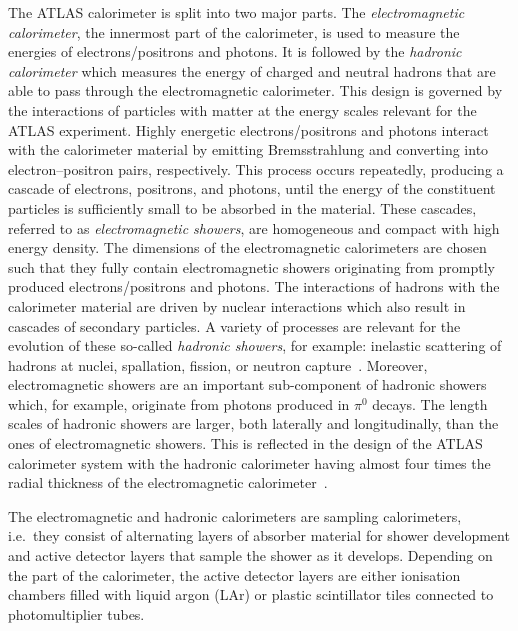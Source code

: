 The ATLAS calorimeter is split into two major parts. The \emph{electromagnetic
  calorimeter}, the innermost part of the calorimeter, is used to measure the
energies of electrons/positrons and photons. It is followed by the
\emph{hadronic calorimeter} which measures the energy of charged and neutral
hadrons that are able to pass through the electromagnetic calorimeter. This
design is governed by the interactions of particles with matter at the energy
scales relevant for the ATLAS experiment. Highly energetic electrons/positrons
and photons interact with the calorimeter material by emitting Bremsstrahlung
and converting into electron--positron pairs, respectively. This process occurs
repeatedly, producing a cascade of electrons, positrons, and photons, until the
energy of the constituent particles is sufficiently small to be absorbed in the
material. These cascades, referred to as \emph{electromagnetic showers}, are
homogeneous and compact with high energy density. The dimensions of the
electromagnetic calorimeters are chosen such that they fully contain
electromagnetic showers originating from promptly produced electrons/positrons
and photons. The interactions of hadrons with the calorimeter material are
driven by nuclear interactions which also result in cascades of secondary
particles. A variety of processes are relevant for the evolution of these
so-called \emph{hadronic showers}, for example: inelastic scattering of hadrons
at nuclei, spallation, fission, or neutron
capture~\cite{Kolanoski:2016gyf}. Moreover, electromagnetic showers are an
important sub-component of hadronic showers which, for example, originate from
photons produced in $\pi^0$ decays. The length scales of hadronic showers are
larger, both laterally and longitudinally, than the ones of electromagnetic
showers.
This is reflected in the design of the ATLAS calorimeter system with the
hadronic calorimeter having almost four times the radial thickness of the
electromagnetic calorimeter~\cite{ATLAS-TDR-02,ATLAS-TDR-03}.

The electromagnetic and hadronic calorimeters are sampling calorimeters, i.e.\
they consist of alternating layers of absorber material for shower development
and active detector layers that sample the shower as it develops. Depending on
the part of the calorimeter, the active detector layers are either ionisation
chambers filled with liquid argon (LAr) or plastic scintillator tiles connected
to photomultiplier tubes.


